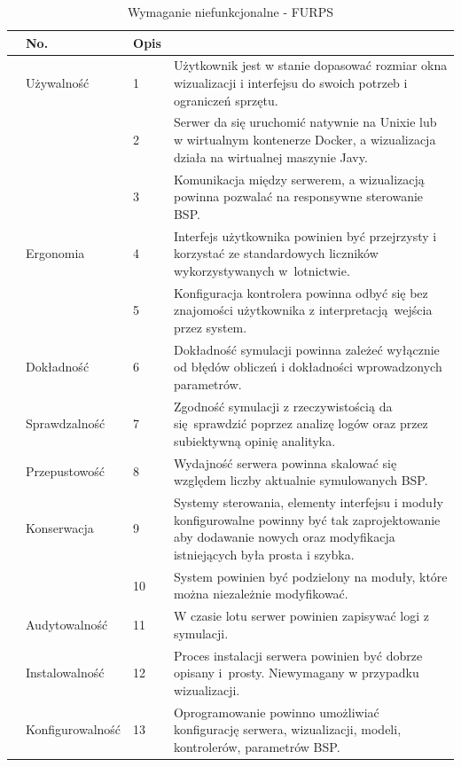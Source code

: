 \documentclass[15pt]{sprawozdanie}
\begin{document}
\renewcommand{\arraystretch}{1.5}
\begin{table}[!h]
	\centering
	\begin{tabular}{|m{}|m{}|m{}|m{}|} 
		\hline
		\rowcolor{Gray}		\multicolumn{2}{|c|}{Wymagania} & No. & Opis \\
		\hline
		\centering \multirow{9}{*}{\rotatebox[origin=c]{90}{Usability}}
		&\multirow{1}{*}{Używalność} 
		& 1 & Użytkownik jest w stanie dopasować rozmiar okna wizualizacji i interfejsu do swoich potrzeb i ograniczeń sprzętu. \\
		\cline{3-4}
		& & 2 & Serwer da się uruchomić natywnie na Unixie lub w wirtualnym kontenerze Docker, a wizualizacja działa na wirtualnej maszynie Javy. \\
		\cline{3-4}
		& & 3 & Komunikacja między serwerem, a wizualizacją powinna pozwalać na responsywne sterowanie BSP. \\
		\cline{2-4}
		& \multirow{1}{*}{Ergonomia} 
		& 4 & Interfejs użytkownika powinien być przejrzysty i korzystać ze standardowych liczników wykorzystywanych w~lotnictwie.  \\
		\cline{3-4}
		& & 5 & Konfiguracja kontrolera powinna odbyć się bez znajomości użytkownika z interpretacją wejścia przez system.  \\
		\hline
		\centering \multirow{3.5}{*}{\rotatebox[origin=c]{90}{Reliability}}
		& \multirow{1}{*}{Dokładność} 
		& 6 & Dokładność symulacji powinna zależeć wyłącznie od błędów obliczeń i dokładności wprowadzonych parametrów. \\
		\cline{2-4}
		& \multirow{1}{*}{Sprawdzalność} 
		& 7 & Zgodność symulacji z rzeczywistością da się sprawdzić poprzez analizę logów oraz przez subiektywną opinię analityka. \\
		\hline
		\centering \multirow{1}{*}{\rotatebox[origin=c]{90}{Perf.}}
		& \multirow{1}{*}{Przepustowość} 
		& 8 & Wydajność serwera powinna skalować się względem liczby aktualnie symulowanych BSP. \\
		\hline
		\centering \multirow{7}{*}{\rotatebox[origin=c]{90}{Supportability}}
		& \multirow{1}{*}{Konserwacja} 
		& 9 &Systemy sterowania, elementy interfejsu i moduły konfigurowalne powinny być tak zaprojektowanie aby dodawanie nowych oraz modyfikacja istniejących była prosta i szybka.  \\
		\cline{3-4}
		& & 10 & System powinien być podzielony na moduły, które można niezależnie modyfikować. \\
		\cline{2-4}
		& \multirow{1}{*}{Audytowalność} 
		& 11 & W czasie lotu serwer powinien zapisywać logi z symulacji. \\
		\cline{2-4}
		& \multirow{1}{*}{Instalowalność} 
		& 12 & Proces instalacji serwera powinien być dobrze opisany i~prosty. Niewymagany w przypadku wizualizacji. \\
		\cline{2-4}
		& \multirow{1}{*}{Konfigurowalność} 
		& 13 & Oprogramowanie powinno umożliwiać konfigurację serwera, wizualizacji, modeli, kontrolerów, parametrów BSP. \\
		\hline
	\end{tabular}
	\caption{Wymaganie niefunkcjonalne - FURPS}
	\label{non_func}
\end{table}
\end{document}
